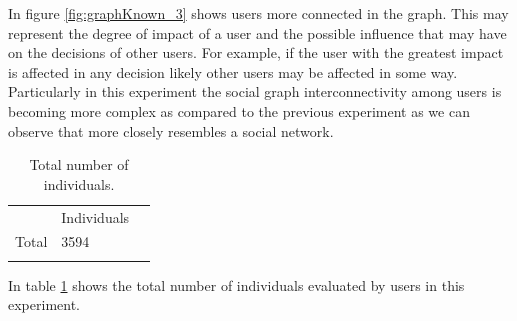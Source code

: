 In figure \ref{fig:graphKnown_3} shows users more connected in the graph. This
may represent the degree of impact of a user and the possible influence that may
have on the decisions of other users. For example, if the user with the greatest
impact is affected in any decision likely other users may be affected in some
way. Particularly in this experiment the social graph interconnectivity among
users is becoming more complex as compared to the previous experiment as we can
observe that more closely resembles a social network.


\begin{table}
\small
\caption{Total number of individuals.}
\label{tab:totalIndividuals_3} 
\centering
\small
\begin{tabular}{p{3cm} p{3cm} p{3cm} }
\hline\noalign{\smallskip}
  & Individuals &  \\
\noalign{\smallskip}\hline\noalign{\smallskip}
\small{Total } & \small{3594} & \\ \hline    
\noalign{\smallskip}\hline
\end{tabular}
\end{table}

In table \ref{tab:totalIndividuals_3} shows the total number of individuals
evaluated by users in this experiment.

